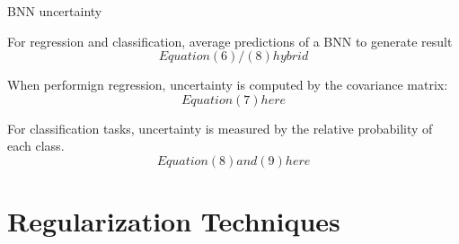 BNN uncertainty \cite{Jospin}

For regression and classification, average predictions of a BNN to generate result
$$
Equation (6) / (8) hybrid
$$

When performign regression, uncertainty is computed by the covariance matrix:
$$
Equation (7) here
$$

For classification tasks, uncertainty is measured by the relative probability of each class.
$$
Equation (8) and (9) here
$$



\section{Regularization Techniques}